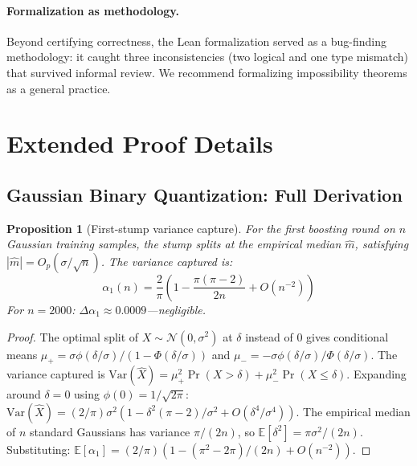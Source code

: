 \documentclass{article}
\newtheorem{proposition}[theorem]{Proposition}
\newcommand{\E}{\mathbb{E}}
\newcommand{\Var}{\mathrm{Var}}
\begin{document}
\paragraph{Formalization as methodology.}
Beyond certifying correctness, the Lean formalization served as a bug-finding methodology: it caught three inconsistencies (two logical and one type mismatch) that survived informal review. We recommend formalizing impossibility theorems as a general practice.


\appendix

\section{Extended Proof Details}

\subsection{Gaussian Binary Quantization: Full Derivation}

\begin{proposition}[First-stump variance capture]
\label{prop:first-stump}
For the first boosting round on $n$ Gaussian training samples, the stump splits at the empirical median $\hat{m}$, satisfying $|\hat{m}| = O_p(\sigma/\sqrt{n})$. The variance captured is:
\[
    \alpha_1(n) = \frac{2}{\pi}\left(1 - \frac{\pi(\pi - 2)}{2n} + O(n^{-2})\right)
\]
For $n = 2000$: $\Delta\alpha_1 \approx 0.0009$---negligible.
\end{proposition}

\begin{proof}
The optimal split of $X \sim \mathcal{N}(0, \sigma^2)$ at $\delta$ instead of $0$ gives conditional means $\mu_+ = \sigma\phi(\delta/\sigma)/(1-\Phi(\delta/\sigma))$ and $\mu_- = -\sigma\phi(\delta/\sigma)/\Phi(\delta/\sigma)$. The variance captured is $\Var(\hat{X}) = \mu_+^2 \Pr(X > \delta) + \mu_-^2 \Pr(X \leq \delta)$. Expanding around $\delta = 0$ using $\phi(0) = 1/\sqrt{2\pi}$: $\Var(\hat{X}) = (2/\pi)\sigma^2(1 - \delta^2(\pi-2)/\sigma^2 + O(\delta^4/\sigma^4))$. The empirical median of $n$ standard Gaussians has variance $\pi/(2n)$, so $\E[\delta^2] = \pi\sigma^2/(2n)$. Substituting: $\E[\alpha_1] = (2/\pi)(1 - (\pi^2-2\pi)/(2n) + O(n^{-2}))$.
\end{proof}
\end{document}
